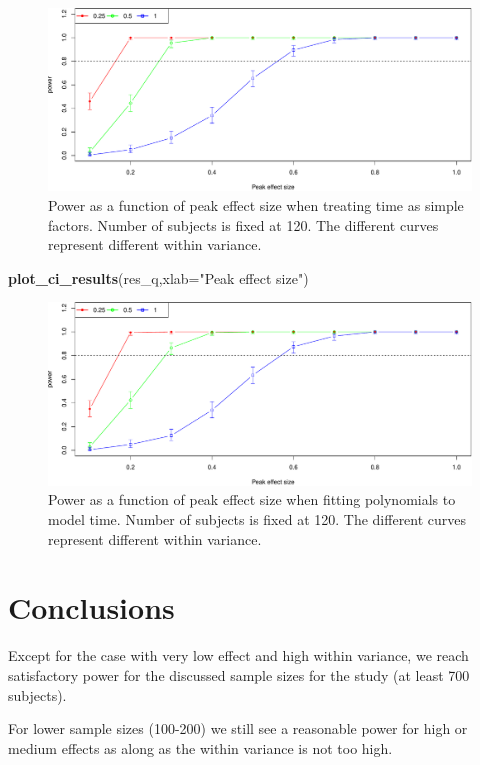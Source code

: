 \documentclass[]{article}
\newenvironment{Shaded}{\begin{snugshade}}{\end{snugshade}}
\newcommand{\KeywordTok}[1]{\textcolor[rgb]{0.13,0.29,0.53}{\textbf{#1}}}
\newcommand{\DataTypeTok}[1]{\textcolor[rgb]{0.13,0.29,0.53}{#1}}
\newcommand{\StringTok}[1]{\textcolor[rgb]{0.31,0.60,0.02}{#1}}
\newcommand{\NormalTok}[1]{#1}
\begin{document}
\begin{figure}
\centering
\includegraphics{power_calculations_files/figure-latex/esizes-1.pdf}
\caption{Power as a function of peak effect size when treating time as
simple factors. Number of subjects is fixed at 120. The different curves
represent different within variance.}
\end{figure}

\begin{Shaded}
\begin{Highlighting}[]
\KeywordTok{plot_ci_results}\NormalTok{(res_q,}\DataTypeTok{xlab=}\StringTok{"Peak effect size"}\NormalTok{)}
\end{Highlighting}
\end{Shaded}

\begin{figure}
\centering
\includegraphics{power_calculations_files/figure-latex/esizes2-1.pdf}
\caption{Power as a function of peak effect size when fitting
polynomials to model time. Number of subjects is fixed at 120. The
different curves represent different within variance.}
\end{figure}

\section{Conclusions}\label{conclusions}

Except for the case with very low effect and high within variance, we
reach satisfactory power for the discussed sample sizes for the study
(at least 700 subjects).

For lower sample sizes (100-200) we still see a reasonable power for
high or medium effects as along as the within variance is not too high.
\end{document}
